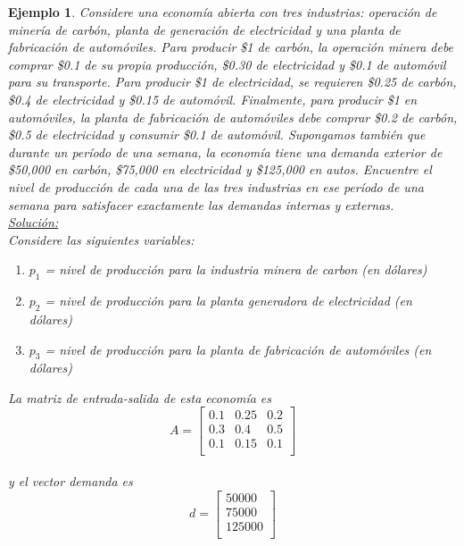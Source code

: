 \documentclass[10pt,a4paper]{article}
\newtheorem{ejemplo}{Ejemplo}[section]
\begin{document}
\begin{multicols}{2}
\begin{ejemplo}
	Considere una economía abierta con tres industrias: operación de minería de carbón, planta de generación de electricidad y una planta de fabricación de automóviles. Para producir \$1 de carbón, la operación minera debe comprar \$0.1 de su propia producción, \$0.30 de electricidad y \$0.1 de automóvil para su transporte. Para producir \$1 de electricidad, se requieren \$0.25 de carbón, \$0.4 de electricidad y \$0.15 de automóvil. Finalmente, para producir \$1 en automóviles, la planta de fabricación de automóviles debe comprar \$0.2 de carbón, \$0.5 de electricidad y consumir \$0.1 de automóvil. Supongamos también que durante un período de una semana, la economía tiene una demanda exterior de  \$50,000 en carbón, \$75,000 en electricidad y \$125,000 en autos. Encuentre el nivel de producción de cada una de las tres industrias en ese período de una semana para satisfacer exactamente las demandas internas y externas.\\
	\underline{Solución:}\\
		Considere las siguientes variables:
		\begin{enumerate}
		\item $p_1$ = nivel de producción para la industria minera de carbon (en dólares)    
		\item $p_2$ = nivel de producción para la planta generadora de electricidad (en dólares)     
		\item $p_3$ = nivel de producción para la planta de fabricación de automóviles (en dólares)
		\end{enumerate}
		La matriz de entrada-salida de esta economía es
		\begin{equation*}
		A=
			\begin{bmatrix}
			0.1 & 0.25 & 0.2\\
			0.3 & 0.4  & 0.5\\
			0.1 & 0.15 & 0.1\\
			\end{bmatrix}
		\end{equation*}\\
		y el vector demanda es
		\begin{equation*}
		d=
		\begin{bmatrix}
		50000 \\
		75000  \\
		125000\\
		\end{bmatrix}
		\end{equation*}\\ 

\end{ejemplo}
\end{multicols}
\end{document}
